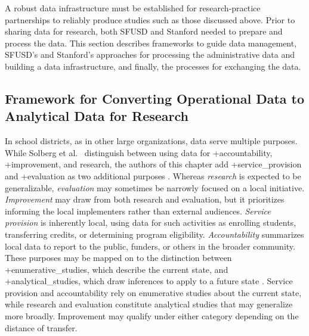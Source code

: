 \documentclass[
]{book}
\begin{document}
A robust data infrastructure must be established for research-practice partnerships to reliably produce studies such as those discussed above. Prior to sharing data for research, both SFUSD and Stanford needed to prepare and process the data. This section describes frameworks to guide data management, SFUSD's and Stanford's approaches for processing the administrative data and building a data infrastructure, and finally, the processes for exchanging the data.

\hypertarget{framework-for-converting-operational-data-to-analytical-data-for-research}{%
\subsection{Framework for Converting Operational Data to Analytical Data for Research}\label{framework-for-converting-operational-data-to-analytical-data-for-research}}

In school districts, as in other large organizations, data serve multiple purposes. While Solberg et al.~\citeyearpar{solberg1997} distinguish between using data for +accountability\textbar, +improvement\textbar, and research, the authors of this chapter add +service\_provision\textbar{} and +evaluation\textbar{} as two additional purposes \citep{sanfranciscounifiedschooldistrict2019}. Whereas \emph{research} is expected to be generalizable, \emph{evaluation} may sometimes be narrowly focused on a local initiative. \emph{Improvement} may draw from both research and evaluation, but it prioritizes informing the local implementers rather than external audiences. \emph{Service provision} is inherently local, using data for such activities as enrolling students, transferring credits, or determining program eligibility. \emph{Accountability} summarizes local data to report to the public, funders, or others in the broader community. These purposes may be mapped on to the distinction between +enumerative\_studies\textbar, which describe the current state, and +analytical\_studies\textbar, which draw inferences to apply to a future state \citep{deming1953, provost2011}. Service provision and accountability rely on enumerative studies about the current state, while research and evaluation constitute analytical studies that may generalize more broadly. Improvement may qualify under either category depending on the distance of transfer.
\end{document}

